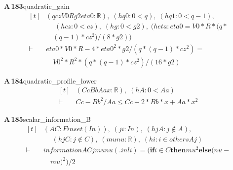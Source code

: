 \documentclass[conference]{IEEEtran}
\theoremstyle{definition}
\newcommand{\lean}[1]{\textsf{\footnotesize #1}}
\begin{document}
\noindent\textbf{A\,183}\quad\lean{quadratic\_gain}
{\footnotesize\[ \begin{aligned}[t]
&(\mathit{q} \mathit{cz} \mathit{V0} \mathit{R} \mathit{g2} \mathit{eta0} : \mathbb{R} ),\; (\mathit{hq0} : 0 < \mathit{q}),\; (\mathit{hq1} : 0 < \mathit{q}-1),\\
&\quad \; (\mathit{hcz} : 0 < \mathit{cz}),\; (\mathit{hg} : 0 < \mathit{g2}),\; (\mathit{heta} : \mathit{eta0} = \mathit{V0}*\mathit{R}*(\mathit{q}*\\
&\quad (\mathit{q}-1)*\mathit{cz}^{2})/(8*\mathit{g2}))\\
\vdash\;&\mathit{eta0}*\mathit{V0}*\mathit{R}-4*\mathit{eta0}^{2}*\mathit{g2}/(\mathit{q}*(\mathit{q}-1)*\mathit{cz}^{2}) =\\
&\quad \mathit{V0}^{2}*\mathit{R}^{2}*(\mathit{q}*(\mathit{q}-1)*\mathit{cz}^{2})/(16*\mathit{g2})
\end{aligned} \]}

\noindent\textbf{A\,184}\quad\lean{quadratic\_profile\_lower}
{\footnotesize\[ \begin{aligned}[t]
&(\mathit{Cc} \mathit{Bb} \mathit{Aa} \mathit{x} : \mathbb{R} ),\; (\mathit{hA} : 0 < \mathit{Aa})\\
\vdash\;&\mathit{Cc}-\mathit{Bb}^{2}/\mathit{Aa} \leq \mathit{Cc}+2*\mathit{Bb}*\mathit{x}+\mathit{Aa}*\mathit{x}^{2}
\end{aligned} \]}

\noindent\textbf{A\,185}\quad\lean{scalar\_information\_B}
{\footnotesize\[ \begin{aligned}[t]
&(\mathit{A} \mathit{C} : \mathit{Finset} (\mathit{I} \mathit{n})),\; (\mathit{j} \mathit{i} : \mathit{I} \mathit{n}),\; (\mathit{hjA} : \mathit{j} \notin \mathit{A}),\\
&\quad \; (\mathit{hjC} : \mathit{j} \notin \mathit{C}),\; (\mathit{mu} \mathit{nu} : \mathbb{R} ),\; (\mathit{hi} : \mathit{i} \in \mathit{others} \mathit{A} \mathit{j})\\
\vdash\;&\mathit{information} \mathit{A} \mathit{C} \mathit{j} \mathit{mu} \mathit{nu} (.\mathit{inl} \mathit{i}) = (\mathbf{if} \mathit{i} \in \mathit{C} \mathbf{then} \mathit{mu}^{2} \mathbf{else} (\mathit{nu}-\\
&\quad \mathit{mu})^{2})/2
\end{aligned} \]}
\end{document}
